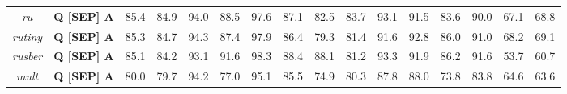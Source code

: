 \begin{table*}
{\begin{tabular}{|c|c||c|c|c|c|c|c|c|c|c|c|c|c|c|c|}
\textit{ru} &  \textbf{Q [SEP] A} & 85.4 & 84.9 & 94.0 & 88.5 & 97.6 & 87.1 & 82.5 & 83.7 & 93.1 & 91.5 & 83.6 & 90.0 & 67.1 & 68.8\\ %
\textit{rutiny} &  \textbf{Q [SEP] A} & 85.3 & 84.7 & 94.3 & 87.4 & 97.9 & 86.4 & 79.3 & 81.4 & 91.6 & 92.8 & 86.0 & 91.0 & 68.2 & 69.1\\ %
\textit{rusber} &  \textbf{Q [SEP] A} & 85.1 & 84.2 & 93.1 & 91.6 & 98.3 & 88.4 & 88.1 & 81.2 & 93.3 & 91.9 & 86.2 & 91.6 & 53.7 & 60.7\\ %
\textit{mult} &  \textbf{Q [SEP] A} & 80.0 & 79.7 & 94.2 & 77.0 & 95.1 & 85.5 & 74.9 & 80.3 & 87.8 & 88.0 & 73.8 & 83.8 & 64.6 & 63.6\\ \hline
\end{tabular}
}
\end{table*}


